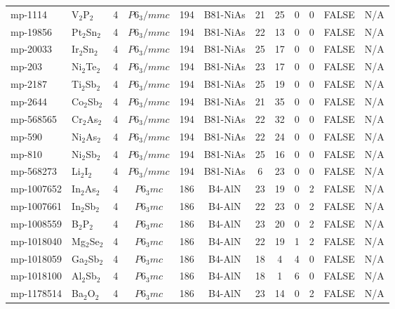 {\begin{longtable}{llcccccccccc}
    mp-1114 & V$_{2}$P$_{2}$ & 4     & $P6_3/mmc$ & 194   & B81-NiAs & 21    & 25    & 0     & 0     & FALSE & N/A \\
    mp-19856 & Pt$_{2}$Sn$_{2}$ & 4     & $P6_3/mmc$ & 194   & B81-NiAs & 22    & 13    & 0     & 0     & FALSE & N/A \\
    mp-20033 & Ir$_{2}$Sn$_{2}$ & 4     & $P6_3/mmc$ & 194   & B81-NiAs & 25    & 17    & 0     & 0     & FALSE & N/A \\
    mp-203 & Ni$_{2}$Te$_{2}$ & 4     & $P6_3/mmc$ & 194   & B81-NiAs & 23    & 17    & 0     & 0     & FALSE & N/A \\
    mp-2187 & Ti$_{2}$Sb$_{2}$ & 4     & $P6_3/mmc$ & 194   & B81-NiAs & 25    & 19    & 0     & 0     & FALSE & N/A \\
    mp-2644 & Co$_{2}$Sb$_{2}$ & 4     & $P6_3/mmc$ & 194   & B81-NiAs & 21    & 35    & 0     & 0     & FALSE & N/A \\
    mp-568565 & Cr$_{2}$As$_{2}$ & 4     & $P6_3/mmc$ & 194   & B81-NiAs & 22    & 32    & 0     & 0     & FALSE & N/A \\
    mp-590 & Ni$_{2}$As$_{2}$ & 4     & $P6_3/mmc$ & 194   & B81-NiAs & 22    & 24    & 0     & 0     & FALSE & N/A \\
    mp-810 & Ni$_{2}$Sb$_{2}$ & 4     & $P6_3/mmc$ & 194   & B81-NiAs & 25    & 16    & 0     & 0     & FALSE & N/A \\
    mp-568273 & Li$_{2}$I$_{2}$ & 4     & $P6_3/mmc$ & 194   & B81-NiAs & 6     & 23    & 0     & 0     & FALSE & N/A \\
    mp-1007652 & In$_{2}$As$_{2}$ & 4     & $P6_3mc$ & 186   & B4-AlN & 23    & 19    & 0     & 2     & FALSE & N/A \\
    mp-1007661 & In$_{2}$Sb$_{2}$ & 4     & $P6_3mc$ & 186   & B4-AlN & 22    & 23    & 0     & 2     & FALSE & N/A \\
    mp-1008559 & B$_{2}$P$_{2}$ & 4     & $P6_3mc$ & 186   & B4-AlN & 23    & 20    & 0     & 2     & FALSE & N/A \\
    mp-1018040 & Mg$_{2}$Se$_{2}$ & 4     & $P6_3mc$ & 186   & B4-AlN & 22    & 19    & 1     & 2     & FALSE & N/A \\
    mp-1018059 & Ga$_{2}$Sb$_{2}$ & 4     & $P6_3mc$ & 186   & B4-AlN & 18    & 4     & 4     & 0     & FALSE & N/A \\
    mp-1018100 & Al$_{2}$Sb$_{2}$ & 4     & $P6_3mc$ & 186   & B4-AlN & 18    & 1     & 6     & 0     & FALSE & N/A \\
    mp-1178514 & Ba$_{2}$O$_{2}$ & 4     & $P6_3mc$ & 186   & B4-AlN & 23    & 14    & 0     & 2     & FALSE & N/A \\

\end{longtable}}
